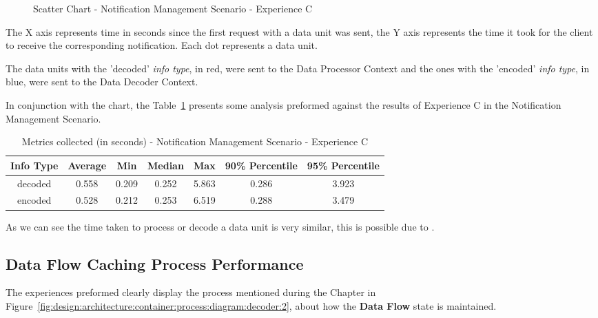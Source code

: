 \begin{figure}[H]
    \centering
    
    \caption[Scatter Chart - Notification Management Scenario - Experience C]{Scatter Chart - Notification Management Scenario - Experience C}
    \label{fig:evaluation:overview:decoproc:chart:s3eC}
\end{figure}

The X axis represents time in seconds since the first request with a data unit was sent, the Y axis represents the time it took for the client to receive the corresponding notification. Each dot represents a data unit.

The data units with the 'decoded' \textit{info type}, in red, were sent to the Data Processor Context and the ones with the 'encoded' \textit{info type}, in blue, were sent to the Data Decoder Context.

In conjunction with the chart, the Table~\ref{tab:evaluation:overview:decoproc:results} presents some analysis preformed against the results of Experience C in the Notification Management Scenario.

\begin{table}[H]
    \centering
    \begin{tabular}{@{}ccccccc@{}}
    \toprule
    \textbf{Info Type} & \textbf{Average} & \textbf{Min} & \textbf{Median} & \textbf{Max} & \textbf{90\% Percentile} & \textbf{95\% Percentile} \\ \midrule
    decoded & 0.558 & 0.209 & 0.252 & 5.863 & 0.286 & 3.923 \\ \midrule
    encoded & 0.528 & 0.212 & 0.253 & 6.519 & 0.288 & 3.479 \\ \bottomrule
    \end{tabular}
    \caption{Metrics collected (in seconds) - Notification Management Scenario - Experience C}
    \label{tab:evaluation:overview:decoproc:results}
\end{table}

As we can see the time taken to process or decode a data unit is very similar, this is possible due to .

\subsection{Data Flow Caching Process Performance}
\label{subsubsec:evaluation:overview:cache}

The experiences preformed clearly display the process mentioned during the  Chapter in Figure~\ref{fig:design:architecture:container:process:diagram:decoder:2}, about how the \textbf{Data Flow} state is maintained. 

